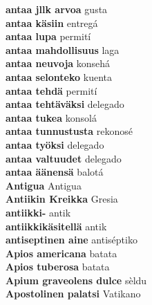 \textbf{ antaa jllk arvoa  } gusta \\
\textbf{ antaa käsiin  } entregá \\
\textbf{ antaa lupa  } permití \\
\textbf{ antaa mahdollisuus  } laga \\
\textbf{ antaa neuvoja  } konsehá \\
\textbf{ antaa selonteko  } kuenta \\
\textbf{ antaa tehdä  } permití \\
\textbf{ antaa tehtäväksi  } delegado \\
\textbf{ antaa tukea  } konsolá \\
\textbf{ antaa tunnustusta  } rekonosé \\
\textbf{ antaa työksi  } delegado \\
\textbf{ antaa valtuudet  } delegado \\
\textbf{ antaa äänensä  } balotá \\
\textbf{ Antigua  } Antigua \\
\textbf{ Antiikin Kreikka  } Gresia \\
\textbf{ antiikki-  } antik \\
\textbf{ antiikkikäsitellä  } antik \\
\textbf{ antiseptinen aine  } antiséptiko \\
\textbf{ Apios americana  } batata \\
\textbf{ Apios tuberosa  } batata \\
\textbf{ Apium graveolens dulce  } sèldu \\
\textbf{ Apostolinen palatsi  } Vatikano \\
